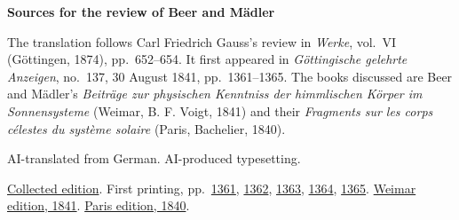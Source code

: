 \clearpage\thispagestyle{empty}
\begin{center}\Large\bfseries Sources for the review of Beer and Mädler\end{center}

The translation follows Carl Friedrich Gauss’s review in \emph{Werke}, vol.~VI (Göttingen, 1874), pp.~652--654. It first appeared in \emph{Göttingische gelehrte Anzeigen}, no.~137, 30 August 1841, pp.~1361--1365. The books discussed are Beer and Mädler’s \emph{Beiträge zur physischen Kenntniss der himmlischen Körper im Sonnensysteme} (Weimar, B. F. Voigt, 1841) and their \emph{Fragments sur les corps célestes du système solaire} (Paris, Bachelier, 1840).

AI-translated from German. AI-produced typesetting.

\href{https://gdz.sub.uni-goettingen.de/id/PPN236007467}{Collected edition}. First printing, pp.~\href{https://images.p.sub.uni-goettingen.de/iiif/image/gdz:PPN385030444_1841_2:00000355/full/full/0/default.jpg}{1361}, \href{https://images.p.sub.uni-goettingen.de/iiif/image/gdz:PPN385030444_1841_2:00000356/full/full/0/default.jpg}{1362}, \href{https://images.p.sub.uni-goettingen.de/iiif/image/gdz:PPN385030444_1841_2:00000357/full/full/0/default.jpg}{1363}, \href{https://images.p.sub.uni-goettingen.de/iiif/image/gdz:PPN385030444_1841_2:00000358/full/full/0/default.jpg}{1364}, \href{https://images.p.sub.uni-goettingen.de/iiif/image/gdz:PPN385030444_1841_2:00000359/full/full/0/default.jpg}{1365}. \href{https://doi.org/10.3931/e-rara-49144}{Weimar edition, 1841}. \href{https://books.google.nl/books?id=F85CAQAAMAAJ&pg=PP7}{Paris edition, 1840}.

\clearpage
